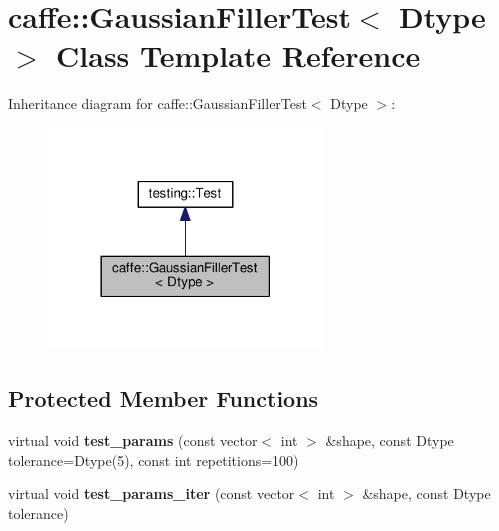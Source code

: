 \hypertarget{classcaffe_1_1_gaussian_filler_test}{}\section{caffe\+:\+:Gaussian\+Filler\+Test$<$ Dtype $>$ Class Template Reference}
\label{classcaffe_1_1_gaussian_filler_test}


Inheritance diagram for caffe\+:\+:Gaussian\+Filler\+Test$<$ Dtype $>$\+:
\nopagebreak
\begin{figure}[H]
\begin{center}
\leavevmode
\includegraphics[width=206pt]{classcaffe_1_1_gaussian_filler_test__inherit__graph}
\end{center}
\end{figure}
\subsection*{Protected Member Functions}
\begin{DoxyCompactItemize}
\item 
\mbox{\label{classcaffe_1_1_gaussian_filler_test_a6c864927cbea6e4697108541d697d1d9}} 
virtual void {\bfseries test\+\_\+params} (const vector$<$ int $>$ \&shape, const Dtype tolerance=Dtype(5), const int repetitions=100)
\item 
\mbox{\label{classcaffe_1_1_gaussian_filler_test_a8e9fd896fcb63e19f1109732654535f7}} 
virtual void {\bfseries test\+\_\+params\+\_\+iter} (const vector$<$ int $>$ \&shape, const Dtype tolerance)
\end{DoxyCompactItemize}
